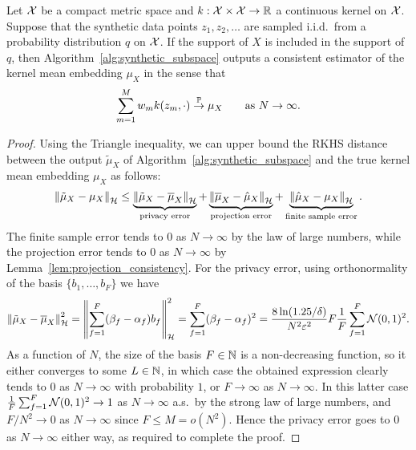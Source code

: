 \begin{hthm}
	\label{app:thm:synthetic_data_consistency}
	Let $\mathcal{X}$ be a compact metric space and $k : \mathcal{X} \times \mathcal{X} \to \mathbb{R}$ a continuous kernel on $\mathcal{X}$. Suppose that the synthetic data points $z_1, z_2, \ldots$ are sampled i.i.d.~from a probability distribution $q$ on $\mathcal{X}$. If the support of $X$ is included in the support of $q$, then Algorithm~\ref{alg:synthetic_subspace} outputs a consistent estimator of the kernel mean embedding $\mu_X$ in the sense that
	\begin{equation}
	\sum_{m = 1}^M w_m k(z_m, \cdot)
	\stackrel{\mathbb{P}}{\to}
	\mu_X
	\hspace{2em} \text{as } N \to \infty
	.
	\end{equation}
	\begin{proof}
		Using the Triangle inequality, we can upper bound the RKHS distance between the output $\tilde{\mu}_X$ of Algorithm~\ref{alg:synthetic_subspace} and the true kernel mean embedding $\mu_X$ as follows:
		\begin{equation}
		\left\| \tilde{\mu}_X - \mu_X \right\|_{\mathcal{H}}
		\leq
		\underbrace{
			\left\| \tilde{\mu}_X - \overline{\mu}_X \right\|_{\mathcal{H}}
		}_{\text{privacy error}}
		+
		\underbrace{
			\left\| \overline{\mu}_X - \hat{\mu}_X \right\|_{\mathcal{H}}
		}_{\text{projection error}}
		+
		\underbrace{
			\left\| \hat{\mu}_X - \mu_X \right\|_{\mathcal{H}}
		}_{\text{finite sample error}}
		.
		\label{eq:synthetic_subspace_consistency:triangle_bound}
		\end{equation}
		The finite sample error tends to $0$ as $N \to \infty$ by the law of large numbers, while the projection error tends to $0$ as $N \to \infty$ by Lemma~\ref{lem:projection_consistency}. For the privacy error, using orthonormality of the basis $
		\{ b_1, \ldots, b_F \}$ we have
		\begin{equation}
		\left\| \tilde{\mu}_X - \overline{\mu}_X \right\|_{\mathcal{H}}^2
		=
		\left\| \sum_{f = 1}^F (\beta_f - \alpha_f) b_f \right\|_{\mathcal{H}}^2
		=
		\sum_{f = 1}^F (\beta_f - \alpha_f)^2
		=
		\frac{8 \ln(1.25 / \delta)}{N^2 \varepsilon^2} F \frac{1}{F} \sum_{f = 1}^F \mathcal{N}(0, 1)^2
		.
		\end{equation}
		As a function of $N$, the size of the basis $F \in \mathbb{N}$ is a non-decreasing function, so it either converges to some $L \in \mathbb{N}$, in which case the obtained expression clearly tends to $0$ as $N \to \infty$ with probability $1$, or $F \to \infty$ as $N \to \infty$. In this latter case $\frac{1}{F} \sum_{f = 1}^F \mathcal{N}(0, 1)^2 \to 1$ as $N \to \infty$ a.s.~by the strong law of large numbers, and $F / N^2 \to 0$ as $N \to \infty$ since $F \leq M = o(N^2)$. Hence the privacy error goes to $0$ as $N \to \infty$ either way, as required to complete the proof.
	\end{proof}
\end{hthm}


